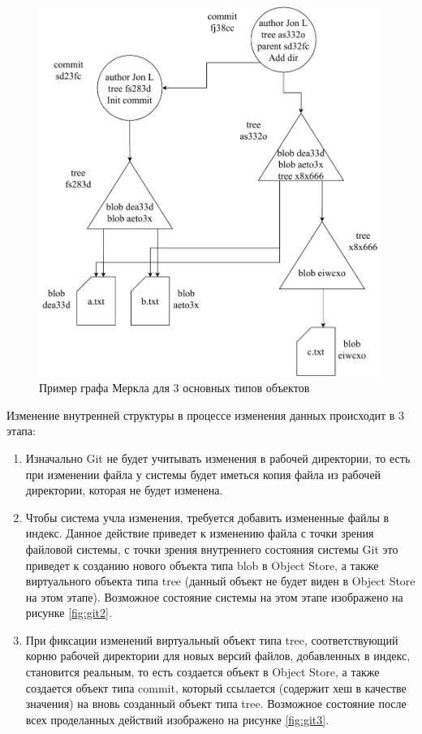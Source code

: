 \begin{figure}[hbtp]
	\centering
	\includegraphics[width=\textwidth]{./img/git-mdag.pdf}
	\caption{Пример графа Меркла для 3 основных типов объектов}
	\label{fig:git1}
\end{figure}

Изменение внутренней структуры в процессе изменения данных происходит в 3 этапа:
\begin{enumerate}
	\item Изначально Git не будет учитывать изменения в рабочей директории, то есть при изменении файла у системы будет иметься копия файла из рабочей директории, которая не будет изменена.
	\item Чтобы система учла изменения, требуется добавить измененные файлы в индекс. Данное действие приведет к изменению файла с точки зрения файловой системы, с точки зрения внутреннего состояния системы Git это приведет к созданию нового объекта типа blob в Object Store, а также виртуального объекта типа tree (данный объект не будет виден в Object Store на этом этапе). Возможное состояние системы на этом этапе изображено на рисунке \ref{fig:git2}.
	\item При фиксации изменений виртуальный объект типа tree, соответствующий корню рабочей директории для новых версий файлов, добавленных в индекс, становится реальным, то есть создается объект в Object Store, а также создается объект типа commit, который ссылается (содержит хеш в качестве значения) на вновь созданный объект типа tree. Возможное состояние после всех проделанных действий изображено на рисунке \ref{fig:git3}.
\end{enumerate}

